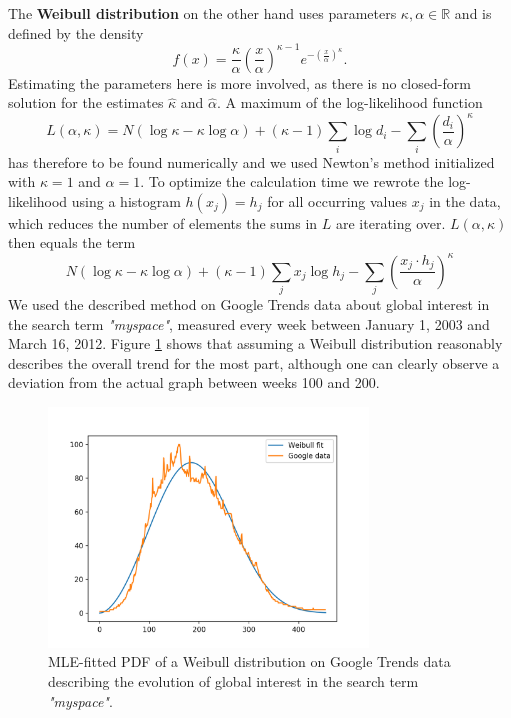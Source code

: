\documentclass{article}
\begin{document}
The \textbf{Weibull distribution} on the other hand uses parameters $\kappa, \alpha\in \mathbb{R}$ and is defined by the density
\[f(x) = \frac{\kappa}{\alpha}\left(\frac{x}{\alpha}\right)^{\kappa-1}e^{-(\frac{x}{\alpha})^\kappa}.\]
Estimating the parameters here is more involved, as there is no closed-form solution for the estimates $\hat{\kappa}$ and $\hat{\alpha}$. A maximum of the log-likelihood function
\[L(\alpha,\kappa) = N(\log \kappa - \kappa \log \alpha) + (\kappa-1)\sum_i \log d_i - \sum_i \left(\frac{d_i}{\alpha}\right)^{\kappa}\]
has therefore to be found numerically and we used Newton's method initialized with $\kappa=1$ and $\alpha=1$. To optimize the calculation time we rewrote the log-likelihood using a histogram $h(x_j) = h_j$ for all occurring values $x_j$ in the data, which reduces the number of elements the sums in $L$ are iterating over. $L(\alpha,\kappa)$ then equals the term
\[N(\log \kappa - \kappa \log \alpha) + (\kappa-1)\sum_j x_j \log h_j - \sum_j \left(\frac{x_j\cdot h_j}{\alpha}\right)^{\kappa}\]
We used the described method on Google Trends data about global interest in the search term \emph{"myspace"}, measured every week between January 1, 2003 and March 16, 2012. Figure \ref{fig:myspace-weibull} shows that assuming a Weibull distribution reasonably describes the overall trend for the most part, although one can clearly observe a deviation from the actual graph between weeks 100 and 200.
\begin{figure}
\centering
  \centerline{\includegraphics[width=8.5cm]{img/project1/plot3}}
\caption{MLE-fitted PDF of a Weibull distribution on Google Trends data describing the evolution of global interest in the search term \emph{"myspace"}.}
\label{fig:myspace-weibull}
\end{figure}
\end{document}
